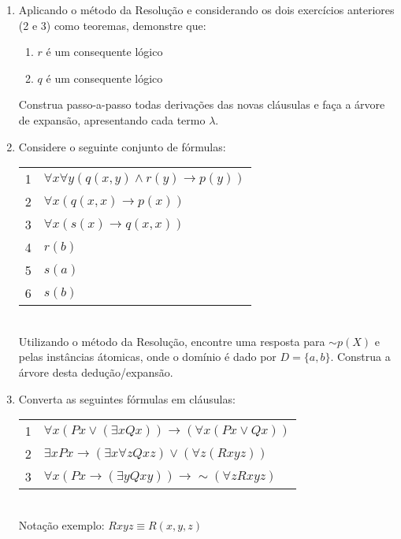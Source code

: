 \documentclass[10pt, a4paper,final]{article}
\begin{document}
\begin{enumerate}
\item Aplicando o método da Resolução e considerando os dois exercícios anteriores (2 e 3) como teoremas,  demonstre que:
\begin{enumerate}
\setlength{\itemsep}{-2pt}
\item $ r $ é um consequente lógico
\item $ q $ é um consequente lógico
\end{enumerate}

Construa passo-a-passo todas derivaç\~oes das novas cláusulas e faça a  árvore de expansão,  apresentando cada termo $\lambda$.


\item Considere o seguinte conjunto de f\'ormulas: \\

\begin{tabular}{ll}
1 &  $\forall x\forall y (q(x,y) \wedge r(y) \rightarrow p(y)) $ \\
2 &  $\forall x (q(x,x) \rightarrow p(x))  $ \\
3 &  $\forall x (s(x) \rightarrow q(x,x)) $ \\
4 &  $r(b)$ \\ 
5 &  $s(a)$ \\
6 &  $s(b)$ \\
\end{tabular}\\
Utilizando o método da Resolução, encontre uma resposta para $\sim p(X)$ e
pelas instâncias átomicas, onde o domínio é dado por $D=\{a,b\}$. Construa 
a árvore desta dedução/expansão.

\item Converta as seguintes fórmulas em cláusulas:
\begin{tabular}{ll}
1 &  $ \forall x (Px \vee (\exists x Qx )) \rightarrow (\forall x (Px \vee Qx )) $ \\
2 &  $ \exists x Px  \rightarrow (\exists x  \forall z Qxz ) \vee (\forall z (Rxyz))$ \\
3 &  $ \forall x (Px \rightarrow (\exists y Qxy )) \rightarrow \sim (\forall z  Rxyz ) $ \\
\end{tabular}\\
Notação exemplo: $Rxyz \equiv R(x,y,z)$


\end{enumerate}
\end{document}
